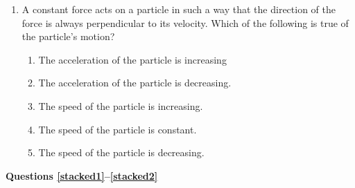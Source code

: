 \documentclass{../../../oss-classkick}
\begin{document}
\begin{multicols*}{2}
\begin{enumerate}[resume,leftmargin=18pt]
  \item A constant force acts on a particle in such a way that the direction of
    the force is always perpendicular to its velocity. Which of the
    following is true of the particle's motion?
    \begin{enumerate}[nosep,leftmargin=18pt,label=(\Alph*)]
    \item The acceleration of the particle is increasing
    \item The acceleration of the particle is decreasing.
    \item The speed of the particle is increasing.
    \item The speed of the particle is constant.
    \item The speed of the particle is decreasing.
    \end{enumerate}
    \vspace{.7in}
    
  \end{enumerate}
  
  \textbf{Questions \ref{stacked1}--\ref{stacked2}}


\end{multicols*}
\end{document}
